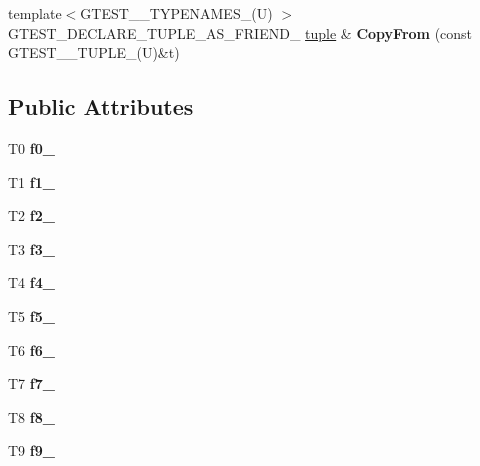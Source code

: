 \begin{DoxyCompactItemize}
\item 
\mbox{\label{classstd_1_1tr1_1_1tuple_a3d06fb121d18b6e1c10d14f9e966618d}} 
{\footnotesize template$<$G\+T\+E\+S\+T\+\_\+\_\+\+T\+Y\+P\+E\+N\+A\+M\+E\+S\+\_\+(\+U) $>$ }\\G\+T\+E\+S\+T\+\_\+\+D\+E\+C\+L\+A\+R\+E\+\_\+\+T\+U\+P\+L\+E\+\_\+\+A\+S\+\_\+\+F\+R\+I\+E\+N\+D\+\_\+ \hyperlink{classstd_1_1tr1_1_1tuple}{tuple} \& {\bfseries Copy\+From} (const G\+T\+E\+S\+T\+\_\+\_\+\+T\+U\+P\+L\+E\+\_\+(U)\&t)
\end{DoxyCompactItemize}
\subsection*{Public Attributes}
\begin{DoxyCompactItemize}
\item 
\mbox{\label{classstd_1_1tr1_1_1tuple_a771b1d99e8800fb284acd04bca838cbb}} 
T0 {\bfseries f0\+\_\+}
\item 
\mbox{\label{classstd_1_1tr1_1_1tuple_a7cccf899dedc626c51fa4f6921d0ac52}} 
T1 {\bfseries f1\+\_\+}
\item 
\mbox{\label{classstd_1_1tr1_1_1tuple_aaec06c27366502dc332ef96878628f84}} 
T2 {\bfseries f2\+\_\+}
\item 
\mbox{\label{classstd_1_1tr1_1_1tuple_ad4d3673e0d5c07c392c02e335fe978ff}} 
T3 {\bfseries f3\+\_\+}
\item 
\mbox{\label{classstd_1_1tr1_1_1tuple_ab662f1051c2302d065796383848db6c4}} 
T4 {\bfseries f4\+\_\+}
\item 
\mbox{\label{classstd_1_1tr1_1_1tuple_a32d8cd6f180c0a77d83733fc65423657}} 
T5 {\bfseries f5\+\_\+}
\item 
\mbox{\label{classstd_1_1tr1_1_1tuple_a597beab3af3f95c84408491ab14632b0}} 
T6 {\bfseries f6\+\_\+}
\item 
\mbox{\label{classstd_1_1tr1_1_1tuple_a7c28780e616d382833e844f62672c6bc}} 
T7 {\bfseries f7\+\_\+}
\item 
\mbox{\label{classstd_1_1tr1_1_1tuple_ae859012c83943e54e035a4a32089ccb6}} 
T8 {\bfseries f8\+\_\+}
\item 
\mbox{\label{classstd_1_1tr1_1_1tuple_a336d5e582fd34e45ec88c78d473671dd}} 
T9 {\bfseries f9\+\_\+}
\end{DoxyCompactItemize}
